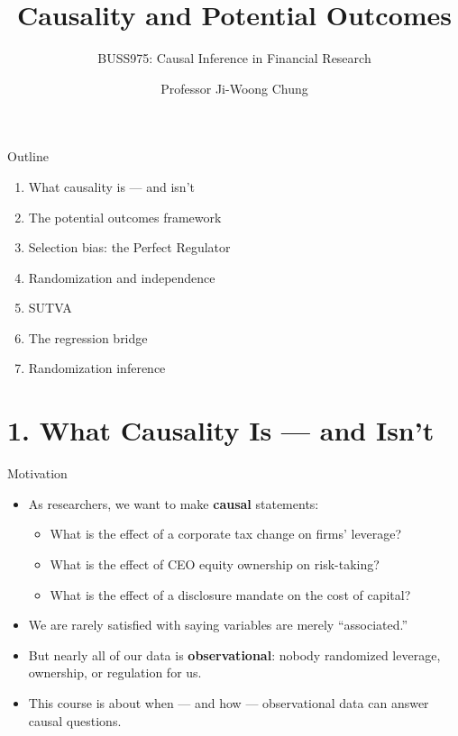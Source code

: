 \documentclass[
  11pt,
  ignorenonframetext,
  aspectratio=169,
]{beamer}
\title{\texorpdfstring{Causality and Potential
Outcomes}{Causality and Potential Outcomes}}
\subtitle{\texorpdfstring{BUSS975: Causal Inference in Financial
Research}{BUSS975: Causal Inference in Financial Research}}
\author{Professor Ji-Woong Chung}
\date{}
\institute{Korea University}
\providecommand{\tightlist}{%
  \setlength{\itemsep}{0pt}\setlength{\parskip}{0pt}}
\begin{document}
\frame{\titlepage}


\begin{frame}{Outline}
\protect{}\label{outline}
\begin{enumerate}
\tightlist
\item
  What causality is --- and isn't
\item
  The potential outcomes framework
\item
  Selection bias: the Perfect Regulator
\item
  Randomization and independence
\item
  SUTVA
\item
  The regression bridge
\item
  Randomization inference
\end{enumerate}
\end{frame}

\section{1. What Causality Is --- and
Isn't}\label{what-causality-is-and-isnt}

\begin{frame}{Motivation}
\protect{}\label{motivation}
\begin{itemize}
\tightlist
\item
  As researchers, we want to make \textbf{causal} statements:

  \begin{itemize}
  \tightlist
  \item
    What is the effect of a corporate tax change on firms' leverage?
  \item
    What is the effect of CEO equity ownership on risk-taking?
  \item
    What is the effect of a disclosure mandate on the cost of capital?
  \end{itemize}
\item
  We are rarely satisfied with saying variables are merely
  ``associated.''
\item
  But nearly all of our data is \textbf{observational}: nobody
  randomized leverage, ownership, or regulation for us.
\item
  This course is about when --- and how --- observational data can
  answer causal questions.
\end{itemize}
\end{frame}
\end{document}
